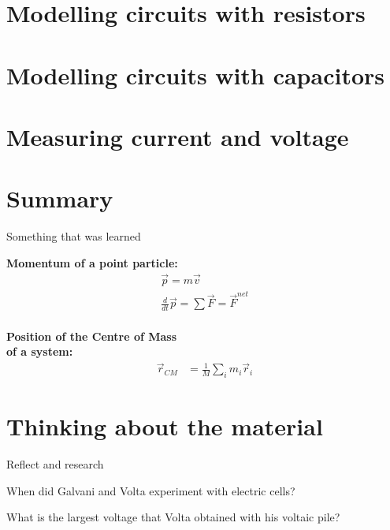 \section{Modelling circuits with resistors}

\section{Modelling circuits with capacitors}

\section{Measuring current and voltage}

\newpage
\section{Summary}

\begin{chapterSummary}
 Something that was learned
\end{chapterSummary}

\newpage
\begin{importantEquations}
\medskip
\begin{multicols}{2}
\textbf{Momentum of a point particle:}
\begin{align*}
\vec p = m\vec v \\
\frac{d}{dt}\vec p = \sum \vec F = \vec F^{net}
\end{align*}
\columnbreak
\\
\textbf{Position of the Centre of Mass \\ of a system:}
\begin{align*}
\vec r_{CM} &=\frac{1}{M}\sum_i m_i\vec r_i 
\end{align*}
\medskip
\end{multicols}
\end{importantEquations}

\newpage
\section{Thinking about the material}

\begin{chapteractivity}{Reflect and research}
{
\item When did Galvani and Volta experiment with electric cells?
\item What is the largest voltage that Volta obtained with his voltaic pile?
}
\end{chapteractivity}

